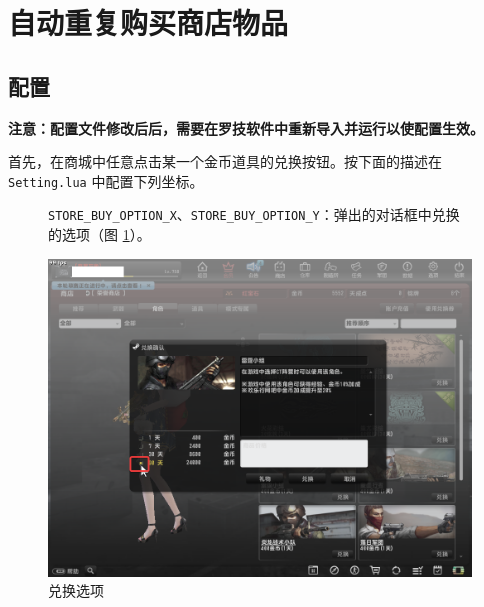 \section{自动重复购买商店物品}

\subsection{配置}

\textbf{\color{red}注意：配置文件修改后后，需要在罗技软件中重新导入并运行以使配置生效。}

首先，在商城中任意点击某一个金币道具的兑换按钮。按下面的描述在 \lstinline{Setting.lua} 中配置下列坐标。

\begin{figure}[H]
    \Centering
    \parbox[l]{\textwidth}{\lstinline{STORE_BUY_OPTION_X}、\lstinline{STORE_BUY_OPTION_Y}：弹出的对话框中兑换的选项（图 \ref{ch4fig-store-buy-option}）。}
    \includegraphics[width=\textwidth]{docs/assets/store_buy_option.png}
    \caption{兑换选项}
    \label{ch4fig-store-buy-option}
\end{figure}

